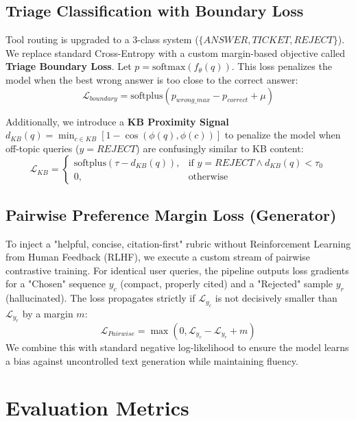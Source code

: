 \documentclass[11pt]{article}
\begin{document}
\subsection{Triage Classification with Boundary Loss}
Tool routing is upgraded to a 3-class system ($\{ANSWER, TICKET, REJECT\}$). We replace standard Cross-Entropy with a custom margin-based objective called \textbf{Triage Boundary Loss}. Let $p = \text{softmax}(f_\theta(q))$. This loss penalizes the model when the best wrong answer is too close to the correct answer:
\begin{equation}
\mathcal{L}_{boundary} = \text{softplus}(p_{wrong\_max} - p_{correct} + \mu)
\end{equation}

Additionally, we introduce a \textbf{KB Proximity Signal} $d_{KB}(q) = \min_{c \in KB} [1 - \cos(\phi(q), \phi(c))]$ to penalize the model when off-topic queries ($y = REJECT$) are confusingly similar to KB content:
\begin{equation}
\mathcal{L}_{KB} = \begin{cases} 
\text{softplus}(\tau - d_{KB}(q)), & \text{if } y = REJECT \land d_{KB}(q) < \tau_0 \\ 
0, & \text{otherwise} 
\end{cases}
\end{equation}

\subsection{Pairwise Preference Margin Loss (Generator)}
To inject a "helpful, concise, citation-first" rubric without Reinforcement Learning from Human Feedback (RLHF), we execute a custom stream of pairwise contrastive training. For identical user queries, the pipeline outputs loss gradients for a "Chosen" sequence $y_c$ (compact, properly cited) and a "Rejected" sample $y_r$ (hallucinated). The loss propagates strictly if $\mathcal{L}_{y_c}$ is not decisively smaller than $\mathcal{L}_{y_r}$ by a margin $m$:
\begin{equation}
\mathcal{L}_{Pairwise} = \max(0, \mathcal{L}_{y_c} - \mathcal{L}_{y_r} + m)
\end{equation}
We combine this with standard negative log-likelihood to ensure the model learns a bias against uncontrolled text generation while maintaining fluency.

\section{Evaluation Metrics}
\end{document}

